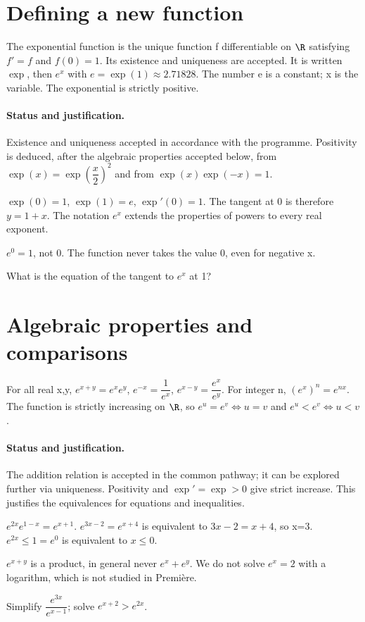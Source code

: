 \section{Defining a new function}\label{C09-U1}
\begin{keypoint}
The exponential function is the unique function f differentiable on $\R$ satisfying $f\prime=f$ and $f(0)=1$. Its existence and uniqueness are accepted. It is written $\exp$, then $e^x$ with $e=\exp(1)\approx\num{2,71828}$. The number e is a constant; x is the variable. The exponential is strictly positive.
\end{keypoint}
\paragraph{Status and justification.} Existence and uniqueness accepted in accordance with the programme. Positivity is deduced, after the algebraic properties accepted below, from $\exp (x)=\exp (\dfrac{x}{2})^2$ and from $\exp(x)\exp(-x)=1$.
\begin{example}$\exp(0)=1$, $\exp(1)=e$, $\exp\prime(0)=1$. The tangent at 0 is therefore $y=1+x$. The notation $e^x$ extends the properties of powers to every real exponent.\end{example}\label{C09-EX1}
\begin{pitfall}$e^0=1$, not 0. The function never takes the value 0, even for negative x.\end{pitfall}
\begin{application}What is the equation of the tangent to $e^x$ at 1?\end{application}\label{C09-AP1}
\section{Algebraic properties and comparisons}\label{C09-U2}
\begin{keypoint}
For all real x,y, $e^{x+y}=e^xe^y$, $e^{-x}=\dfrac{1}{e^x}$, $e^{x-y}=\dfrac{e^x}{e^y}$. For integer n, $(e^x)^n=e^{nx}$. The function is strictly increasing on $\R$, so $e^u=e^v\iff u=v$ and $e^u<e^v\iff u<v$.
\end{keypoint}
\paragraph{Status and justification.} The addition relation is accepted in the common pathway; it can be explored further via uniqueness. Positivity and $\exp\prime=\exp>0$ give strict increase. This justifies the equivalences for equations and inequalities.
\begin{example}$e^{2x}e^{1-x}=e^{x+1}$. $e^{3x-2}=e^{x+4}$ is equivalent to $3x-2=x+4$, so x=3. $e^{2x}\leq1=e^0$ is equivalent to $x\leq0$.\end{example}\label{C09-EX2}
\begin{pitfall}$e^{x+y}$ is a product, in general never $e^x+e^y$. We do not solve $e^x=2$ with a logarithm, which is not studied in Première.\end{pitfall}
\begin{application}Simplify $\dfrac{e^{3x}}{e^{x-1}}$; solve $e^{x+2}>e^{2x}$.\end{application}\label{C09-AP2}
